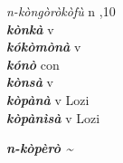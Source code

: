 \begin{multicols}{2}
{{\itshape n-kòngòròkòfù}} \relax  n  ,10  \relax   \relax  \\
{{\bfseries\itshape kònkà}} \relax  v  \relax   \relax  {} \relax   \relax  \\
{{\bfseries\itshape kókòmònà}} \relax  v  \relax   \relax  {} \relax   \relax  \\
{{\bfseries\itshape kónò}} \relax  con  \relax   \relax  {} \relax   \relax  \\
{{\bfseries\itshape kònsà}} \relax  v  \relax   \relax  {} \relax   \relax  \\
{{\bfseries\itshape kòpànà}} \relax  v  \relax   \relax  {} \relax  Lozi \relax  \\
{{\bfseries\itshape kòpànìsà}} \relax  v  \relax   \relax  {} \relax  Lozi \relax  \\
{{\bfseries\itshape n-kòpèrò {\textasciitilde}}

}
\end{multicols}

